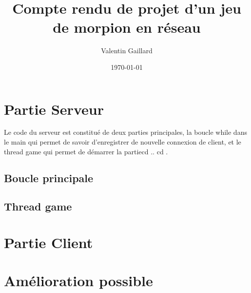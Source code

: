 \documentclass[11pt,a4paper]{report}
\title{Compte rendu de projet d'un jeu de morpion en réseau}
\author{Valentin Gaillard}
\date{\today}
\begin{document}
\maketitle

\tableofcontents


\chapter{Partie Serveur}
\quad Le code du serveur est constitué de deux parties principales, la boucle while dans le main qui permet de savoir d'enregistrer de nouvelle connexion de client, et le thread game qui permet de démarrer la partiecd ..
cd .
\section{Boucle principale}

\quad 


\newpage

\section{Thread game}

\quad 

\chapter{Partie Client}


\chapter{Amélioration possible}
\end{document}
